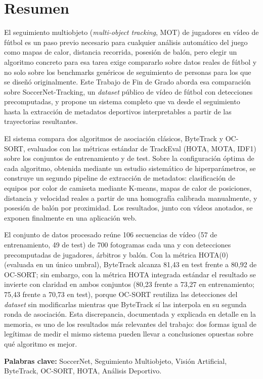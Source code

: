 \chapter*{Resumen}

El seguimiento multiobjeto (\emph{multi-object tracking}, MOT) de jugadores
en vídeo de fútbol es un paso previo necesario para cualquier análisis
automático del juego como mapas de calor, distancia recorrida, posesión de
balón, pero elegir un algoritmo concreto para esa tarea exige compararlo
sobre datos reales de fútbol y no solo sobre los benchmarks genéricos de
seguimiento de personas para los que se diseñó originalmente. Este Trabajo
de Fin de Grado aborda esa comparación sobre SoccerNet-Tracking, un
\emph{dataset} público de vídeo de fútbol con detecciones precomputadas, y
propone un sistema completo que va desde el seguimiento hasta la
extracción de metadatos deportivos interpretables a partir de las
trayectorias resultantes.

El sistema compara dos algoritmos de
asociación clásicos, ByteTrack y OC-SORT, evaluados con las métricas
estándar de TrackEval (HOTA, MOTA, IDF1) sobre los conjuntos de
entrenamiento y de test. Sobre la configuración óptima de cada algoritmo,
obtenida mediante un estudio sistemático de hiperparámetros, se construye
un segundo pipeline de extracción de metadatos: clasificación de equipos
por color de camiseta mediante K-means, mapas de calor de posiciones,
distancia y velocidad reales a partir de una homografía calibrada
manualmente, y posesión de balón por proximidad. Los resultados, junto con
vídeos anotados, se exponen finalmente en una aplicación web.

El conjunto de datos procesado reúne 106 secuencias de vídeo (57 de
entrenamiento, 49 de test) de 700 fotogramas cada una y con
detecciones precomputadas de jugadores, árbitros y balón. Con la métrica
HOTA(0) (evaluada en un único umbral),
ByteTrack alcanza 81,43 en test frente a 80,92 de OC-SORT; sin embargo,
con la métrica HOTA integrada estándar el resultado se invierte con
claridad en ambos conjuntos (80,23 frente a 73,27 en entrenamiento; 75,43
frente a 70,73 en test), porque OC-SORT reutiliza las detecciones del
\emph{dataset} sin modificarlas mientras que ByteTrack sí las interpola en
su segunda ronda de asociación. Esta discrepancia, documentada y explicada
en detalle en la memoria, es uno de los resultados más relevantes del
trabajo: dos formas igual de legítimas de medir el mismo sistema pueden
llevar a conclusiones opuestas sobre qué algoritmo es mejor.

\vspace{.5cm}

\textbf{Palabras clave:} SoccerNet, Seguimiento Multiobjeto, Visión
Artificial, ByteTrack, OC-SORT, HOTA, Análisis Deportivo.
